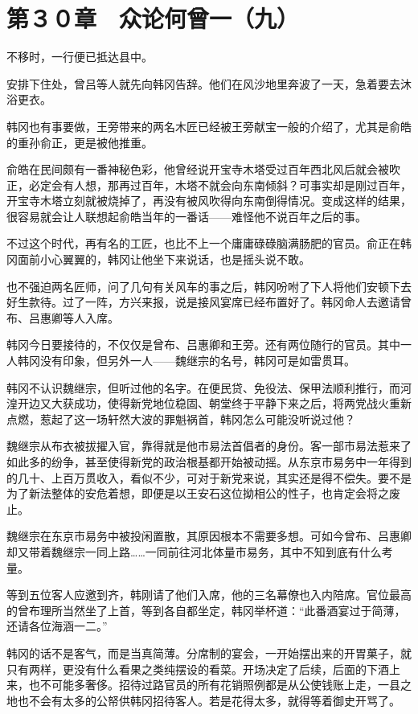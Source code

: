 \section{第３０章　众论何曾一（九）}

不移时，一行便已抵达县中。

安排下住处，曾吕等人就先向韩冈告辞。他们在风沙地里奔波了一天，急着要去沐浴更衣。

韩冈也有事要做，王旁带来的两名木匠已经被王旁献宝一般的介绍了，尤其是俞皓的重孙俞正，更是被他推重。

俞皓在民间颇有一番神秘色彩，他曾经说开宝寺木塔受过百年西北风后就会被吹正，必定会有人想，那再过百年，木塔不就会向东南倾斜？可事实却是刚过百年，开宝寺木塔立刻就被烧掉了，再没有被风吹得向东南倒得情况。变成这样的结果，很容易就会让人联想起俞皓当年的一番话——难怪他不说百年之后的事。

不过这个时代，再有名的工匠，也比不上一个庸庸碌碌脑满肠肥的官员。俞正在韩冈面前小心翼翼的，韩冈让他坐下来说话，也是摇头说不敢。

也不强迫两名匠师，问了几句有关风车的事之后，韩冈吩咐了下人将他们安顿下去好生款待。过了一阵，方兴来报，说是接风宴席已经布置好了。韩冈命人去邀请曾布、吕惠卿等人入席。

韩冈今日要接待的，不仅仅是曾布、吕惠卿和王旁。还有两位随行的官员。其中一人韩冈没有印象，但另外一人——魏继宗的名号，韩冈可是如雷贯耳。

韩冈不认识魏继宗，但听过他的名字。在便民贷、免役法、保甲法顺利推行，而河湟开边又大获成功，使得新党地位稳固、朝堂终于平静下来之后，将两党战火重新点燃，惹起了这一场轩然大波的罪魁祸首，韩冈怎么可能没听说过他？

魏继宗从布衣被拔擢入官，靠得就是他市易法首倡者的身份。客一部市易法惹来了如此多的纷争，甚至使得新党的政治根基都开始被动摇。从东京市易务中一年得到的几十、上百万贯收入，看似不少，可对于新党来说，其实还是得不偿失。要不是为了新法整体的安危着想，即便是以王安石这位拗相公的性子，也肯定会将之废止。

魏继宗在东京市易务中被投闲置散，其原因根本不需要多想。可如今曾布、吕惠卿却又带着魏继宗一同上路……一同前往河北体量市易务，其中不知到底有什么考量。

等到五位客人应邀到齐，韩刚请了他们入席，他的三名幕僚也入内陪席。官位最高的曾布理所当然坐了上首，等到各自都坐定，韩冈举杯道：“此番酒宴过于简薄，还请各位海涵一二。”

韩冈的话不是客气，而是当真简薄。分席制的宴会，一开始摆出来的开胃菓子，就只有两样，更没有什么看果之类纯摆设的看菜。开场决定了后续，后面的下酒上来，也不可能多奢侈。招待过路官员的所有花销照例都是从公使钱账上走，一县之地也不会有太多的公帑供韩冈招待客人。若是花得太多，就得等着御史开骂了。

